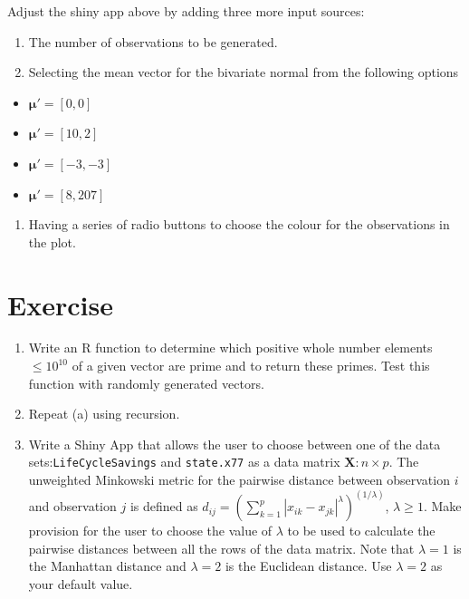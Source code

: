\documentclass[
]{book}
\providecommand{\tightlist}{%
  \setlength{\itemsep}{0pt}\setlength{\parskip}{0pt}}
\begin{document}
Adjust the shiny app above by adding three more input sources:

\begin{enumerate}
\def\labelenumi{\roman{enumi}.}
\item
  The number of observations to be generated.
\item
  Selecting the mean vector for the bivariate normal from the following options
\end{enumerate}

\begin{itemize}
\tightlist
\item
  \(\mathbf{\mu}' = [0, 0]\)
\item
  \(\mathbf{\mu}' = [10, 2]\)
\item
  \(\mathbf{\mu}' = [-3, -3]\)
\item
  \(\mathbf{\mu}' = [8, 207]\)
\end{itemize}

\begin{enumerate}
\def\labelenumi{\roman{enumi}.}
\setcounter{enumi}{2}
\tightlist
\item
  Having a series of radio buttons to choose the colour for the observations in the plot.
\end{enumerate}

\section{Exercise}\label{exercise-13}

\begin{enumerate}
\def\labelenumi{(\alph{enumi})}
\item
  Write an R function to determine which positive whole number elements \(≤10^{10}\) of a given vector are prime and to return these primes. Test this function with randomly generated vectors.
\item
  Repeat (a) using recursion.
\item
  Write a Shiny App that allows the user to choose between one of the data sets:\texttt{LifeCycleSavings} and \texttt{state.x77} as a data matrix \(\mathbf{X}:n \times p\). The unweighted Minkowski metric for the pairwise distance between observation \(i\) and observation \(j\) is defined as \(d_{ij} = \left( \sum_{k=1}^p{|x_{ik}-x_{jk}|^λ} \right)^{(1/λ)}\), \(λ≥1\). Make provision for the user to choose the value of \(\lambda\) to be used to calculate the pairwise distances between all the rows of the data matrix. Note that \(λ=1\) is the Manhattan distance and \(λ=2\) is the Euclidean distance. Use \(λ=2\) as your default value.
\end{enumerate}
\end{document}
